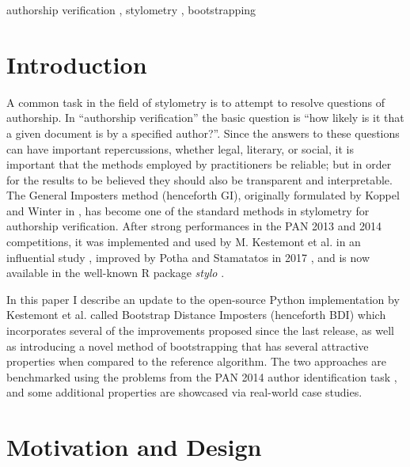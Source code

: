 \documentclass[
    hf
]{ceurart}
\begin{document}
\begin{keywords}
    authorship verification \sep
    stylometry \sep
    bootstrapping
\end{keywords}

\maketitle

\section{Introduction}

A common task in the field of stylometry is to attempt to resolve questions of authorship. In
``authorship verification'' the basic question is ``how likely is it that a given document is by a
specified author?''. Since the answers to these questions can have important repercussions, whether
legal, literary, or social, it is important that the methods employed by practitioners be reliable;
but in order for the results to be believed they should also be transparent and interpretable. The
General Imposters method (henceforth GI), originally formulated by Koppel and Winter in
\cite{koppel_gi}, has become one of the standard methods in stylometry for authorship verification.
After strong performances in the PAN 2013 and 2014 competitions, it was implemented and used by M.
Kestemont et al. in an influential study \cite{kestemont_caesar}, improved by Potha and Stamatatos
in 2017 \cite{potha_improved_gi}, and is now available in the well-known R package \emph{stylo}
\cite{stylo}.

In this paper I describe an update to the open-source Python implementation by Kestemont et al.
\cite{kestemont_ruzicka} called Bootstrap Distance Imposters (henceforth BDI) which incorporates
several of the improvements proposed since the last release, as well as introducing a novel method
of bootstrapping that has several attractive properties when compared to the reference algorithm.
The two approaches are benchmarked using the problems from the PAN 2014 author identification task
\cite{pan_2014}, and some additional properties are showcased via real-world case studies.

\section{Motivation and Design}
\end{document}
